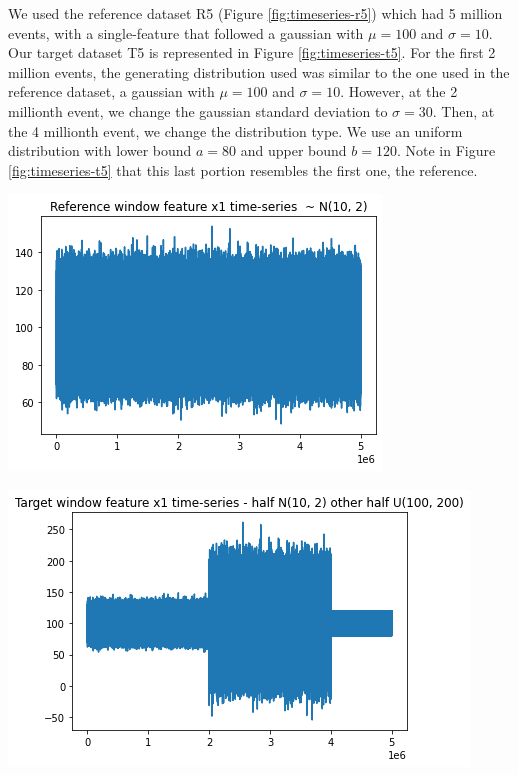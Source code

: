 We used the reference dataset R5 (Figure \ref{fig:timeseries-r5}) which had 5 million events, with a single-feature that followed a gaussian with  $\mu=100$ and $\sigma=10$. Our target dataset T5 is represented in Figure \ref{fig:timeseries-t5}. For the first 2 million events, the generating distribution used was similar to the one used in the reference dataset, a gaussian with $\mu=100$ and $\sigma=10$. However, at the 2 millionth event, we change the gaussian standard deviation to $\sigma=30$. Then, at the 4 millionth event, we change the distribution type. We use an uniform distribution with lower bound $a=80$ and upper bound $b=120$. Note in Figure \ref{fig:timeseries-t5} that this last portion resembles the first one, the reference.
\begin{center}
\begin{minipage}{.5\textwidth}
  \centering
  \includegraphics[width=1\linewidth]{figures/timeseries-r5.png}
  \label{fig:timeseries-r5}
\end{minipage}%
\begin{minipage}{.5\textwidth}
  \centering
  \includegraphics[width=1\linewidth]{figures/timeseries-t5.png}
  \label{fig:timeseries-t5}
\end{minipage}
\end{center}

